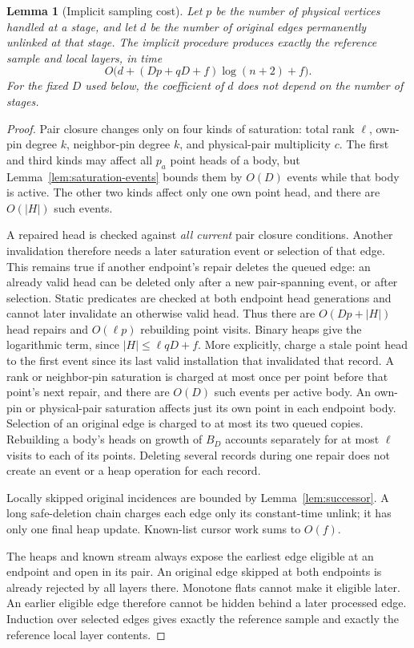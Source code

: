 \documentclass[11pt,a4paper]{article}
\newtheorem{lemma}[theorem]{Lemma}
\theoremstyle{definition}
\theoremstyle{remark}
\begin{document}
\begin{lemma}[Implicit sampling cost]\label{lem:heap-cost}
Let $p$ be the number of physical vertices handled at a
stage, and let $d$ be the number of original edges
permanently unlinked at that stage. The implicit procedure
produces exactly the reference sample and local layers,
in time
\begin{equation}\label{eq:heap-cost}
 O\bigl(d+(Dp+qD+f)\log(n+2)+f\bigr).
\end{equation}
For the fixed $D$ used below, the coefficient of $d$
does not depend on the number of stages.
\end{lemma}
\begin{proof}
Pair closure changes only on four kinds of saturation:
total rank $\ell$, own-pin degree $k$, neighbor-pin
degree $k$, and physical-pair multiplicity $c$.
The first and third kinds may affect all $p_a$ point
heads of a body, but Lemma~\ref{lem:saturation-events}
bounds them by $O(D)$ events while that body is active.
The other two kinds affect only one own point head,
and there are $O(|H|)$ such events.

A repaired head is checked against \emph{all current}
pair closure conditions. Another invalidation therefore
needs a later saturation event or selection of that
edge. This remains true if another endpoint's repair
deletes the queued edge: an already valid head can be
deleted only after a new pair-spanning event, or after
selection. Static predicates are checked at both
endpoint head generations and cannot later invalidate
an otherwise valid head.
Thus there are $O(Dp+|H|)$ head repairs and
$O(\ell p)$ rebuilding point visits.
Binary heaps give the logarithmic term, since
$|H|\leq\ell qD+f$.
More explicitly, charge a stale point head to the first event
since its last valid installation that invalidated that record.
A rank or neighbor-pin saturation is charged at most once per
point before that point's next repair, and there are $O(D)$ such
events per active body. An own-pin or physical-pair saturation
affects just its own point in each endpoint body. Selection of
an original edge is charged to at most its two queued copies.
Rebuilding a body's heads on growth of $B_D$ accounts separately
for at most $\ell$ visits to each of its points. Deleting several
records during one repair does not create an event or a heap
operation for each record.

Locally skipped original incidences are bounded by
Lemma~\ref{lem:successor}. A long safe-deletion chain
charges each edge only its constant-time unlink;
it has only one final heap update.
Known-list cursor work sums to $O(f)$.

The heaps and known stream always expose the earliest
edge eligible at an endpoint and open in its pair.
An original edge skipped at both endpoints is already
rejected by all layers there. Monotone flats cannot
make it eligible later.
An earlier eligible edge therefore cannot be hidden
behind a later processed edge.
Induction over selected edges gives exactly the
reference sample and exactly the reference local
layer contents.
\end{proof}
\end{document}

